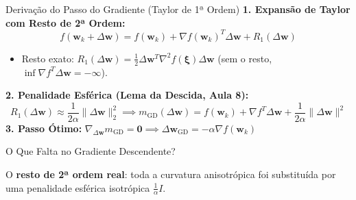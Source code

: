 \documentclass[aspectratio=169, 10pt]{beamer}
\newenvironment{calloutwarning}[1][Atenção]{%
  \begin{alertblock}{#1}%
}{%
  \end{alertblock}%
}
\begin{document}
\begin{frame}{Derivação do Passo do Gradiente (Taylor de 1ª Ordem)}
  \textbf{1. Expansão de Taylor com Resto de 2ª Ordem:}
  \[f(\mathbf{w}_k + \Delta\mathbf{w}) = f(\mathbf{w}_k) + \nabla f(\mathbf{w}_k)^T \Delta\mathbf{w} + R_1(\Delta\mathbf{w})\]
  \begin{itemize}
    \item Resto exato: $R_1(\Delta\mathbf{w}) = \frac{1}{2}\Delta\mathbf{w}^T \nabla^2 f(\boldsymbol{\xi})\Delta\mathbf{w}$ (sem o resto, $\inf \nabla f^T \Delta\mathbf{w} = -\infty$).
  \end{itemize}
  \vspace{0.2cm}
  \textbf{2. Penalidade Esférica (Lema da Descida, Aula 8):}
  \[R_1(\Delta\mathbf{w}) \approx \frac{1}{2\alpha}\|\Delta\mathbf{w}\|_2^2 \implies m_{\text{GD}}(\Delta\mathbf{w}) = f(\mathbf{w}_k) + \nabla f^T \Delta\mathbf{w} + \frac{1}{2\alpha}\|\Delta\mathbf{w}\|^2\]
  \vspace{0.2cm}
  \textbf{3. Passo Ótimo:} $\nabla_{\Delta\mathbf{w}} m_{\text{GD}} = \mathbf{0} \implies \Delta\mathbf{w}_{\text{GD}} = -\alpha \nabla f(\mathbf{w}_k)$
  \vspace{0.3cm}
  \begin{calloutwarning}[O Que Falta no Gradiente Descendente?]
    O \textbf{resto de 2ª ordem real}: toda a curvatura anisotrópica foi substituída por uma penalidade esférica isotrópica $\frac{1}{\alpha} I$.
  \end{calloutwarning}
\end{frame}
\end{document}
